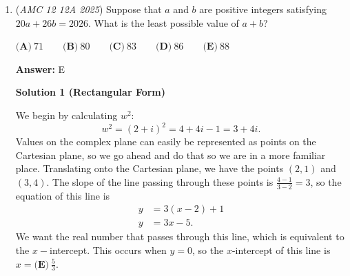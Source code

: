 \begin{enumerate}
 Now, we apply the Law of Cosines on $\triangle ABF$ to solve directly for $BF$:
 \[BF^2 = AB^2 + AF^2 - 2(AB \cdot AF)\cos 30^\circ.\]

 Substituting $AB = 9,$ $AF = \frac{72\sqrt{3}}{11},$ and $\cos 30^\circ = \frac{\sqrt{3}}{2}$:
 \begin{align*} BF^2 &= 9^2 + \left(\frac{72\sqrt{3}}{11}\right)^2 - 2 \cdot 9 \cdot \frac{72\sqrt{3}}{11} \cdot \frac{\sqrt{3}}{2} \\ BF^2 &= 81 + \frac{15552}{121} - \frac{1944}{11}. \end{align*}


 Finding a common denominator of $121$:
 \begin{align*} BF^2 &= \frac{81 \cdot 121 + 15552 - 1944 \cdot 11}{121} \\ BF^2 &= \frac{9801 + 15552 - 21384}{121} \\ BF^2 &= \frac{3969}{121}. \end{align*}


 Taking the square root of both sides ($\sqrt{3969} = 63$ and $\sqrt{121} = 11$), we find:
 \[BF = \frac{63}{11}.\]

 Thus, the answer is $\boxed{\textbf{(E) } \frac{63}{11}}.$



	\item (\textit{AMC 12 12A 2025}) Suppose that $a$ and $b$ are positive integers satisfying $20a + 26b = 2026$. What is the least possible value of $a+b$?


 $\textbf{(A)}\   71  \qquad                 \textbf{(B)}\   80  \qquad                 \textbf{(C)}\   83  \qquad                 \textbf{(D)}\   86  \qquad                 \textbf{(E)}\   88$

 \textbf{Answer: }E



\textbf{Solution 1 (Rectangular Form)}

We begin by calculating $w^2$:
 \[w^2 = (2+i)^2 = 4+4i-1 = 3+4i.\]Values on the complex plane can easily be represented as points on the Cartesian plane, so we go ahead and do that so we are in a more familiar place. Translating onto the Cartesian plane, we have the points $(2,1)$ and $(3,4)$. The slope of the line passing through these points is $\frac{4-1}{3-2} = 3$, so the equation of this line is
 \begin{align*} y &= 3(x-2)+1 \\ y &= 3x-5. \end{align*}
We want the real number that passes through this line, which is equivalent to the $x-$intercept. This occurs when $y=0$, so the $x$-intercept of this line is $x=\boxed{\textbf{(E)}~\frac53}.$





\end{enumerate}

